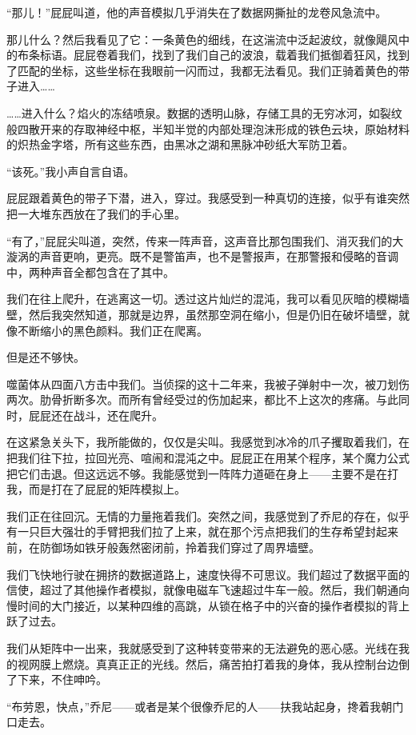 \documentclass[AutoFakeBold=true]{book}
\begin{document}
``那儿！''屁屁叫道，他的声音模拟几乎消失在了数据网撕扯的龙卷风急流中。

{\kaishu 那儿什么？}然后我看见了它：一条黄色的细线，在这湍流中泛起波纹，就像飓风中的布条标语。屁屁卷着我们，找到了我们自己的波浪，载着我们抵御着狂风，找到了匹配的坐标，这些坐标在我眼前一闪而过，我都无法看见。我们正骑着黄色的带子进入……

……进入什么？焰火的冻结喷泉。数据的透明山脉，存储工具的无穷冰河，如裂纹般四散开来的存取神经中枢，半知半觉的内部处理泡沫形成的铁色云块，原始材料的炽热金字塔，所有这些东西，由黑冰之湖和黑脉冲砂纸大军防卫着。

``该死。''我小声自言自语。

屁屁跟着黄色的带子下潜，进入，穿过。我感受到一种真切的连接，似乎有谁突然把一大堆东西放在了我们的手心里。

``有了，''屁屁尖叫道，突然，传来一阵声音，这声音比那包围我们、消灭我们的大漩涡的声音更响，更亮。既不是警笛声，也不是警报声，在那警报和侵略的音调中，两种声音全都包含在了其中。

我们在往上爬升，在逃离这一切。透过这片灿烂的混沌，我可以看见灰暗的模糊墙壁，然后我突然知道，那就是边界，虽然那空洞在缩小，但是仍旧在破坏墙壁，就像不断缩小的黑色颜料。我们正在爬离。

但是还不够快。

噬菌体从四面八方击中我们。当侦探的这十二年来，我被子弹射中一次，被刀划伤两次。肋骨折断多次。而所有曾经受过的伤加起来，都比不上这次的疼痛。与此同时，屁屁还在战斗，还在爬升。

在这紧急关头下，我所能做的，仅仅是尖叫。我感觉到冰冷的爪子攫取着我们，在把我们往下拉，拉回光亮、喧闹和混沌之中。屁屁正在用某个程序，某个魔力公式把它们击退。但这远远不够。我能感觉到一阵阵力道砸在身上——主要不是在打我，而是打在了屁屁的矩阵模拟上。

我们正在往回沉。无情的力量拖着我们。突然之间，我感觉到了乔尼的存在，似乎有一只巨大强壮的手臂把我们拉了上来，就在那个污点把我们的生存希望封起来前，在防御场如铁牙般轰然密闭前，拎着我们穿过了周界墙壁。

我们飞快地行驶在拥挤的数据道路上，速度快得不可思议。我们超过了数据平面的信使，超过了其他操作者模拟，就像电磁车飞速超过牛车一般。然后，我们朝通向慢时间的大门接近，以某种四维的高跳，从锁在格子中的兴奋的操作者模拟的背上跃了过去。

我们从矩阵中一出来，我就感受到了这种转变带来的无法避免的恶心感。光线在我的视网膜上燃烧。真真正正的光线。然后，痛苦拍打着我的身体，我从控制台边倒了下来，不住呻吟。

``布劳恩，快点，''乔尼——或者是某个很像乔尼的人——扶我站起身，搀着我朝门口走去。
\end{document}

